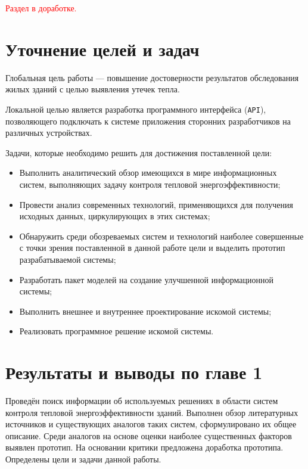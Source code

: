 \textcolor{red}{Раздел в доработке.}

\section{Уточнение целей и задач}

\par

	Глобальная цель работы --- повышение достоверности результатов обследования жилых зданий с целью выявления утечек тепла.

	Локальной целью является разработка программного интерфейса (\texttt{API}), позволяющего подключать к системе приложения сторонних разработчиков на различных устройствах.

	Задачи, которые необходимо решить для достижения поставленной цели:

	\begin{itemize}
		\item Выполнить аналитический обзор имеющихся в мире информационных систем, выполняющих задачу контроля тепловой энергоэффективности;
		\item Провести анализ современных технологий, применяющихся для получения исходных данных, циркулирующих в этих системах;
		\item Обнаружить среди обозреваемых систем и технологий наиболее совершенные с точки зрения поставленной в данной работе цели и выделить прототип разрабатываемой системы;
		\item Разработать пакет моделей на создание улучшенной информационной системы;
		\item Выполнить внешнее и внутреннее проектирование искомой системы;
		\item Реализовать программное решение искомой системы.
	\end{itemize}

\section{Результаты и выводы по главе 1}

\par

	Проведён поиск информации об используемых решениях в области систем контроля тепловой энергоэффективности зданий. Выполнен обзор литературных источников и существующих аналогов таких систем, сформулировано их общее описание. Среди аналогов на основе оценки наиболее существенных факторов выявлен прототип. На основании критики предложена доработка прототипа. Определены цели и задачи данной работы.


